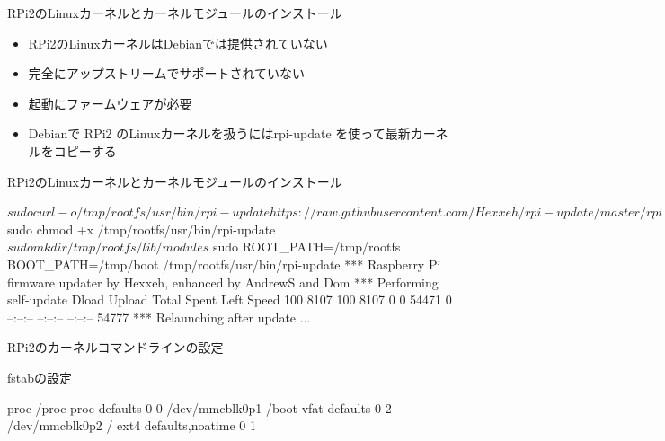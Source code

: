 \begin{frame}[containsverbatim]{RPi2のLinuxカーネルとカーネルモジュールのインストール}

\begin{itemize}
\item RPi2のLinuxカーネルはDebianでは提供されていない
\item 完全にアップストリームでサポートされていない
\item 起動にファームウェアが必要
\item Debianで RPi2 のLinuxカーネルを扱うにはrpi-update を使って最新カーネルをコピーする
\end{itemize}

\end{frame}

\begin{frame}[containsverbatim]{RPi2のLinuxカーネルとカーネルモジュールのインストール}
\begin{commandline}
$ sudo curl -o /tmp/rootfs/usr/bin/rpi-update https://raw.githubusercontent.com/Hexxeh/rpi-update/master/rpi-update
$ sudo chmod +x /tmp/rootfs/usr/bin/rpi-update
$ sudo mkdir /tmp/rootfs/lib/modules
$ sudo ROOT_PATH=/tmp/rootfs BOOT_PATH=/tmp/boot /tmp/rootfs/usr/bin/rpi-update
*** Raspberry Pi firmware updater by Hexxeh, enhanced by AndrewS and Dom 
 *** Performing self-update
                                 Dload  Upload   Total   Spent    Left  Speed
100  8107  100  8107    0     0  54471      0 --:--:-- --:--:-- --:--:-- 54777
 *** Relaunching after update
...
\end{commandline}
\end{frame}

\begin{frame}[containsverbatim]{RPi2のカーネルコマンドラインの設定}

\end{frame}

\begin{frame}[containsverbatim]{fstabの設定}

\begin{commandline}
proc            /proc           proc    defaults	0	0
/dev/mmcblk0p1  /boot           vfat    defaults	0	2
/dev/mmcblk0p2  /               ext4    defaults,noatime	0	1
\end{commandline}

\end{frame}


